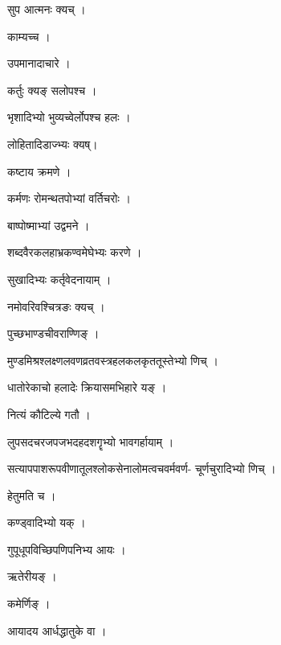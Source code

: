 \documentclass[10pt, openany]{book}
\begin{document}
\noindent सुप आत्मनः क्यच् ।

\noindent काम्यच्च ।

\noindent उपमानादाचारे ।

\noindent कर्तुः क्यङ् सलोपश्च ।

\noindent भृशादिभ्यो भुव्यच्वेर्लोपश्च हलः ।

\noindent लोहितादिडाज्भ्यः क्यष्।

\noindent कष्टाय क्रमणे ।

\noindent कर्मणः रोमन्थतपोभ्यां वर्तिचरोः ।

\noindent बाष्पोष्माभ्यां उद्वमने ।

\noindent शब्दवैरकलहाभ्रकण्वमेघेभ्यः करणे ।

\noindent सुखादिभ्यः कर्तृवेदनायाम् ।

\noindent नमोवरिवश्चित्रङः क्यच् ।

\noindent पुच्छभाण्डचीवराण्णिङ् ।

\noindent मुण्डमिश्रश्लक्ष्णलवणव्रतवस्त्रहलकलकृततूस्तेभ्यो णिच् ।

\noindent धातोरेकाचो हलादेः क्रियासमभिहारे यङ् ।

\noindent नित्यं कौटिल्ये गतौ ।

\noindent लुपसदचरजपजभदहदशगॄभ्यो भावगर्हायाम् ।

\noindent सत्यापपाशरूपवीणातूलश्लोकसेनालोमत्वचवर्मवर्ण- चूर्णचुरादिभ्यो णिच् ।

\noindent हेतुमति च ।

\noindent कण्ड्वादिभ्यो यक् ।

\noindent गुपूधूपविच्छिपणिपनिभ्य आयः ।

\noindent ऋतेरीयङ् ।

\noindent कमेर्णिङ् ।

\noindent आयादय आर्धद्धातुके वा ।
\end{document}
